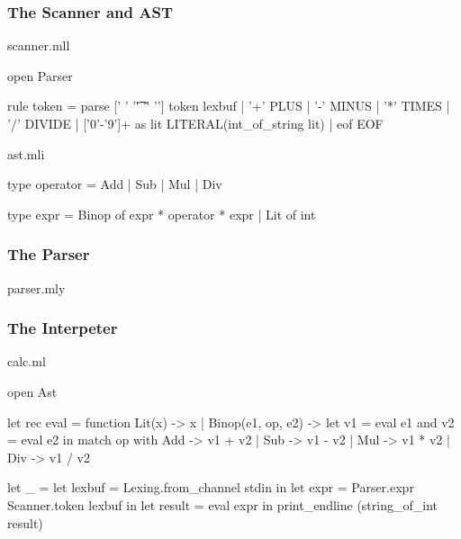 \documentclass{plt}
\begin{document}
\begin{frame}[fragile]
  \frametitle{The Scanner and AST}
scanner.mll


\begin{ocamllex}
{ open Parser }

rule token =
  parse [' ' '\t' '\r' '\n'] { token lexbuf }
      | '+'                  { PLUS }
      | '-'                  { MINUS }
      | '*'                  { TIMES }
      | '/'                  { DIVIDE }
      | ['0'-'9']+ as lit    { LITERAL(int_of_string lit) }
      | eof                  { EOF }
\end{ocamllex}


ast.mli


\begin{ocaml}
type operator = Add | Sub | Mul | Div

type expr =
    Binop of expr * operator * expr
  | Lit of int
\end{ocaml}

\end{frame}

\begin{frame}[fragile]
  \frametitle{The Parser}

parser.mly

\vspace{4pt}

\end{frame}

\begin{frame}[fragile]
  \frametitle{The Interpeter}

calc.ml

\vspace{4pt}

\begin{ocaml}
open Ast

let rec eval = function 
    Lit(x) -> x
  | Binop(e1, op, e2) ->
      let v1 = eval e1 and v2 = eval e2 in
      match op with
        Add -> v1 + v2
      | Sub -> v1 - v2
      | Mul -> v1 * v2
      | Div -> v1 / v2

let _ =
  let lexbuf = Lexing.from_channel stdin in
  let expr = Parser.expr Scanner.token lexbuf in
  let result = eval expr in
  print_endline (string_of_int result)
\end{ocaml}

\end{frame}
\end{document}
